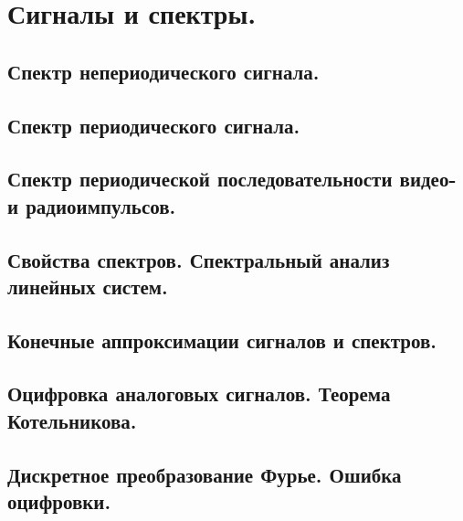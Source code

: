 \documentclass[../main/main.tex]{subfiles}
\begin{document}
\section{Сигналы и спектры.}

\subsection{Спектр непериодического сигнала.}

\subsection{Спектр периодического сигнала.}

\subsection{Спектр периодической последовательности видео- и радиоимпульсов.}

\subsection{Свойства спектров. Спектральный анализ линейных систем.}

\subsection{Конечные аппроксимации сигналов и спектров.}

\subsection{Оцифровка аналоговых сигналов. Теорема Котельникова.}

\subsection{Дискретное преобразование Фурье. Ошибка оцифровки.}
\end{document}
